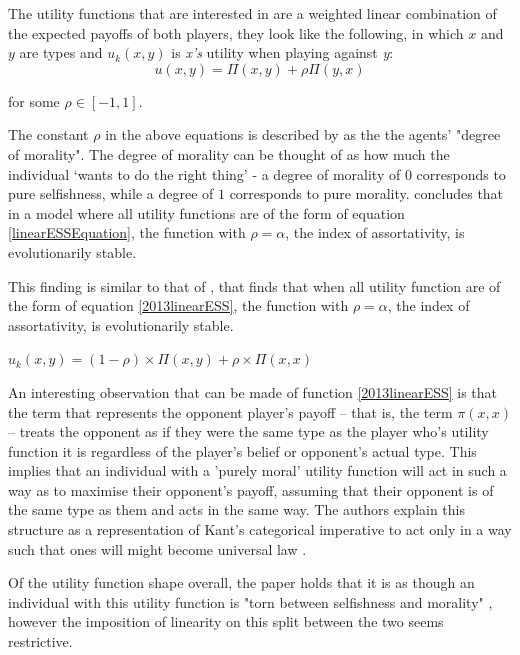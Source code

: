 \documentclass[11pt]{book}
\newcommand*{\np}{\par\noindent\newline}
\begin{document}
\np The utility functions that \citet{alger_generalization_2012} are interested in are a weighted linear combination of the expected payoffs of both players, they look like the following, in which $x$ and $y$ are types and $u_k(x, y)$ is \textit{x's} utility when playing against \textit{y}:
\begin{equation}
	\label{linearESSEquation}
	u(x, y) = \Pi(x,y) + \rho\Pi(y,x)
\end{equation}
\begin{center}
	for some $\rho \in [-1, 1]$.
\end{center}
The constant $\rho$ in the above equations is described by \citet{alger_homo_2013} as the the agents' "degree of morality". 
The degree of morality can be thought of as how much the individual `wants to do the right thing' - a degree of morality of $0$ corresponds to pure selfishness, while a degree of $1$ corresponds to pure morality. 
\citet{alger_generalization_2012} concludes that in a model where all utility functions are of the form of equation \ref{linearESSEquation}, the function with $\rho = \alpha$, the index of assortativity, is evolutionarily stable.

\np This finding is similar to that of \citet{alger_homo_2013}, that finds that when all utility function are of the form of equation \ref{2013linearESS}, the function with $\rho = \alpha$, the index of assortativity, is evolutionarily stable.
\begin{center}
	\label{2013linearESS}
	$u_k(x, y) = (1 - \rho) \times \Pi(x, y) + \rho \times \Pi(x, x)$
\end{center}

An interesting observation that can be made of function \ref{2013linearESS} is that the term that represents the opponent player's payoff -- that is, the term $\pi(x,x)$ -- treats the
opponent as if they were the same type as the player who's utility function it is regardless of the player's belief or opponent's actual type. This implies that an individual with a 'purely moral' utility function will act in such a way as to maximise their opponent's payoff, assuming that their opponent is of the same type as them and acts in the same way. The authors explain this structure as a representation of Kant's categorical imperative to act only in a way such that ones will might become universal law \citep{kant_groundwork_1775}.

\np Of the utility function shape overall, the paper holds that it is as though an individual with this utility function is
 "torn between selfishness and morality" \citep[~p. 2276]{alger_homo_2013}, 
 however the imposition of linearity on this split between the two seems restrictive. 
 
\end{document}
